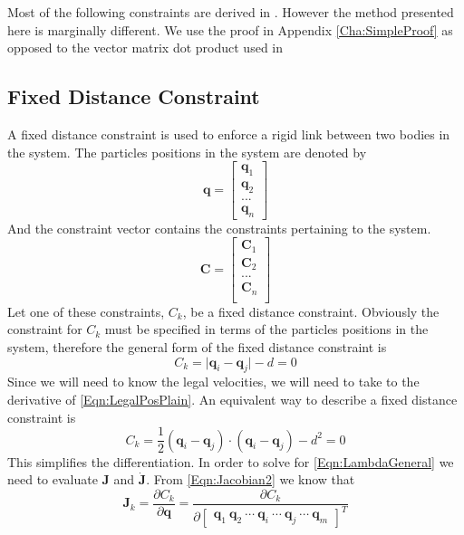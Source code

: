 Most of the following constraints are derived in \cite{Otte}. However the method
presented here is marginally different. We use the proof in
Appendix \ref{Cha:SimpleProof} as opposed to the vector matrix dot product used in
\cite{Otte}

\subsection{Fixed Distance Constraint}
\label{SubSec:FDConst}
A fixed distance constraint is used to enforce a rigid link between two bodies in
the system. The particles positions in the system are denoted by
\[
    \mathbf{q} = 
    \begin{bmatrix}
        \mathbf{q}_1\\
        \mathbf{q}_2\\
        ...\\        
        \mathbf{q}_n
    \end{bmatrix}
\] 
And the constraint vector contains the constraints pertaining to the system.
\[
    \mathbf{C} =
    \begin{bmatrix}
        \mathbf{C}_1\\
        \mathbf{C}_2\\
        ...\\        
        \mathbf{C}_n\\
    \end{bmatrix}
\]
Let one of these constraints, $C_k$, be a fixed distance constraint. Obviously
the constraint for $C_k$ must be specified in terms of the particles positions
in the system, therefore the general form of the fixed distance constraint is 
\begin{equation}
    \label{Eqn:LegalPosPlain}
    C_k = \vert\mathbf{q}_i - \mathbf{q}_j\vert - d = 0
\end{equation}
Since we will need to know the legal velocities, we will need to take to the
derivative of \ref{Eqn:LegalPosPlain}. An equivalent way to describe a fixed
distance constraint is 
\begin{equation}
    \label{Eqn:LegalPos}
    C_k = \frac{1}{2}\left(\mathbf{q}_i - \mathbf{q}_j\right)\cdot\left(\mathbf{q}_i -
    \mathbf{q}_j\right) - d^2 = 0
\end{equation}
This simplifies the differentiation.
In order to solve for \ref{Eqn:LambdaGeneral} we need to evaluate $\mathbf{J}$ and
$\mathbf{\dot{J}}$.
From \ref{Eqn:Jacobian2} we know that
\begin{equation}
    \label{Eqn:JacobianFixedDist1}
    \mathbf{J}_k = \frac{\partial C_k}{\partial \mathbf{q}} =
    \frac{\partial C_k}
    {\partial
        \begin{bmatrix}
            \mathbf{q}_1 \:
            \mathbf{q}_2 \:
            \cdots \:
            \mathbf{q}_i \:
            \cdots \:
            \mathbf{q}_j \:
            \cdots \:
            \mathbf{q}_m
        \end{bmatrix}^T
    }
\end{equation}
